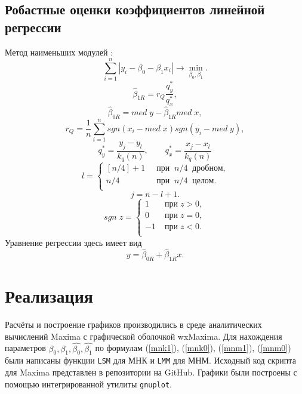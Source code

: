 \documentclass[12pt]{article}
\begin{document}
\begin{flushleft}
\subsection{Робастные оценки коэффициентов линейной регрессии}
Метод наименьших модулей \cite{theory}:
\begin{equation}
    \sum_{i = 1}^{n}|y_i - \beta_0 - \beta_1x_i| \rightarrow \min_{\beta_0, \beta_1}.
\end{equation}
\begin{equation}
    \hat{\beta}_{1R} = r_Q\frac{q^{*}_{y}}{q^{*}_{x}},
    \label{mnm1}
\end{equation}
\begin{equation}
    \hat{\beta}_{0R} = med \; y - \hat{\beta}_{1R} med \; x,
    \label{mnm0}
\end{equation}
\begin{equation}
    r_Q = \frac{1}{n}\sum_{i=1}^{n}sgn(x_i - med \; x)sgn(y_i - med \; y),
\end{equation}
\begin{equation}
    q^{*}_{y} = \frac{y_j - y_l}{k_q(n)}, \qquad q^{*}_{x} = \frac{x_j - x_l}{k_q(n)}
\end{equation}
\[
    l = 
		\left\{
		\begin{aligned}
			 \left[n/4\right] + 1& \;\; \text{при} \;\; n/4 \;\; \text{дробном,}\\
			 n/4                  & \;\; \text{при} \;\; n/4 \;\; \text{целом.}\\
		\end{aligned}
		\right.
\]
\[
    j = n - l + 1.
\]
\[
    sgn \; z = 
		\left\{
		\begin{aligned}
			 1 & \; \text{при} \; z > 0,\\
             0 & \; \text{при} \; z = 0,\\
             -1 & \; \text{при} \; z < 0.\\
		\end{aligned}
		\right.
\]
Уравнение регрессии здесь имеет вид
\begin{equation}
    y = \hat{\beta}_{0R} + \hat{\beta}_{1R}x.
\end{equation}

\newpage

\section{Реализация}

Расчёты и построение графиков производились в среде аналитических вычислений Maxima с графической оболочкой wxMaxima.
Для нахождения параметров $\beta_0, \beta_1, \hat{\beta_0}, \hat{\beta_1}$ по формулам (\ref{mnk1}), (\ref{mnk0}), (\ref{mnm1}), (\ref{mnm0}) были написаны функции \texttt{LSM} для МНК и \texttt{LMM} для МНМ. Исходный код скрипта для Maxima представлен в репозитории на GitHub. Графики были построены с помощью интегрированной утилиты \texttt{gnuplot}. 


\end{flushleft}
\end{document}
